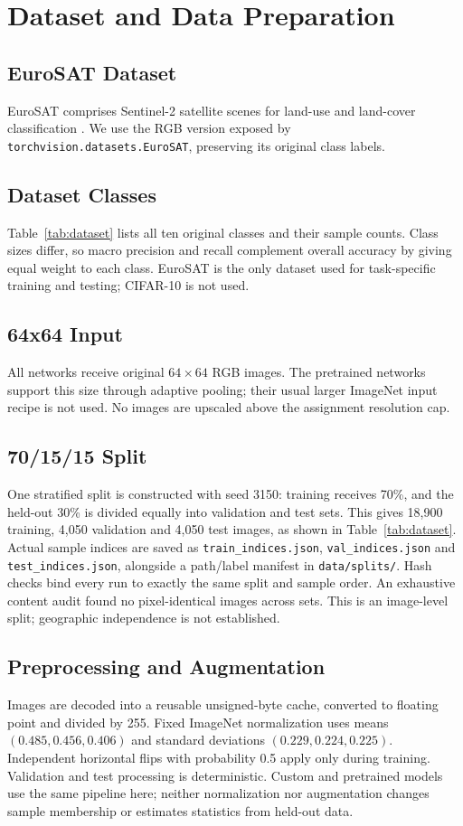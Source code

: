 \section{Dataset and Data Preparation}
\subsection{EuroSAT Dataset}
EuroSAT comprises Sentinel-2 satellite scenes for land-use and land-cover
classification \cite{helber2019}. We use the RGB version exposed by
\texttt{torchvision.datasets.EuroSAT}, preserving its original class labels.
\subsection{Dataset Classes}
Table~\ref{tab:dataset} lists all ten original classes and their sample counts.
Class sizes differ, so macro precision and recall complement overall accuracy
by giving equal weight to each class. EuroSAT is the only dataset used for
task-specific training and testing; CIFAR-10 is not used.


\subsection{64x64 Input}
All networks receive original $64\times64$ RGB images. The pretrained networks
support this size through adaptive pooling; their usual larger ImageNet input
recipe is not used. No images are upscaled above the assignment resolution cap.
\subsection{70/15/15 Split}
One stratified split is constructed with seed 3150: training receives 70\%,
and the held-out 30\% is divided equally into validation and test sets. This
gives 18,900 training, 4,050 validation and 4,050 test images, as shown in
Table~\ref{tab:dataset}.
Actual sample indices are saved as \texttt{train\_indices.json},
\texttt{val\_indices.json} and \texttt{test\_indices.json}, alongside a
path/label manifest in \texttt{data/splits/}.
Hash checks bind every run to exactly the same split and sample order.
An exhaustive content audit found no pixel-identical images across sets.
This is an image-level split; geographic independence is not established.
\subsection{Preprocessing and Augmentation}
Images are decoded into a reusable unsigned-byte cache, converted to floating
point and divided by 255. Fixed ImageNet normalization uses means
$(0.485,0.456,0.406)$ and standard deviations $(0.229,0.224,0.225)$.
Independent horizontal flips with probability 0.5 apply only during training.
Validation and test processing is deterministic. Custom and pretrained models
use the same pipeline here; neither normalization nor augmentation changes
sample membership or estimates statistics from held-out data.
